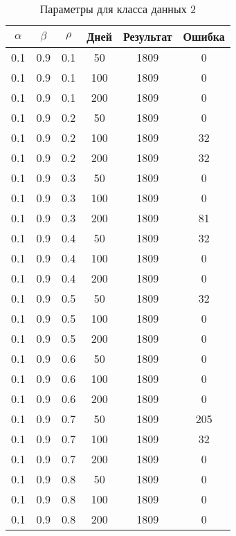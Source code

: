 \renewcommand{\thetable}{A.2}
\begin{table}[h]
	\begin{center}
        \captionsetup{justification=raggedright,singlelinecheck=off}
		\caption{Параметры для класса данных 2\label{tbl:table_kd2}}
		\begin{tabular}{|c|c|c|c|c|c|}
		\hline
		$\alpha$ & $\beta$ & $\rho$ & Дней & Результат & Ошибка 
		\\ \hline
		0.1 &  0.9 &  0.1 &   50 &  1809 &     0 \\
		0.1 &  0.9 &  0.1 &  100 &  1809 &     0 \\
		0.1 &  0.9 &  0.1 &  200 &  1809 &     0 \\
	   \hline
		0.1 &  0.9 &  0.2 &   50 &  1809 &     0 \\
		0.1 &  0.9 &  0.2 &  100 &  1809 &    32 \\
		0.1 &  0.9 &  0.2 &  200 &  1809 &    32 \\
	   \hline
		0.1 &  0.9 &  0.3 &   50 &  1809 &     0 \\
		0.1 &  0.9 &  0.3 &  100 &  1809 &     0 \\
		0.1 &  0.9 &  0.3 &  200 &  1809 &    81 \\
	   \hline
		0.1 &  0.9 &  0.4 &   50 &  1809 &    32 \\
		0.1 &  0.9 &  0.4 &  100 &  1809 &     0 \\
		0.1 &  0.9 &  0.4 &  200 &  1809 &     0 \\
	   \hline
		0.1 &  0.9 &  0.5 &   50 &  1809 &    32 \\
		0.1 &  0.9 &  0.5 &  100 &  1809 &     0 \\
		0.1 &  0.9 &  0.5 &  200 &  1809 &     0 \\
	   \hline
		0.1 &  0.9 &  0.6 &   50 &  1809 &     0 \\
		0.1 &  0.9 &  0.6 &  100 &  1809 &     0 \\
		0.1 &  0.9 &  0.6 &  200 &  1809 &     0 \\
	   \hline
		0.1 &  0.9 &  0.7 &   50 &  1809 &   205 \\
		0.1 &  0.9 &  0.7 &  100 &  1809 &    32 \\
		0.1 &  0.9 &  0.7 &  200 &  1809 &     0 \\
	   \hline
		0.1 &  0.9 &  0.8 &   50 &  1809 &     0 \\
		0.1 &  0.9 &  0.8 &  100 &  1809 &     0 \\
		0.1 &  0.9 &  0.8 &  200 &  1809 &     0 \\

\end{tabular}
\end{center}
\end{table}
